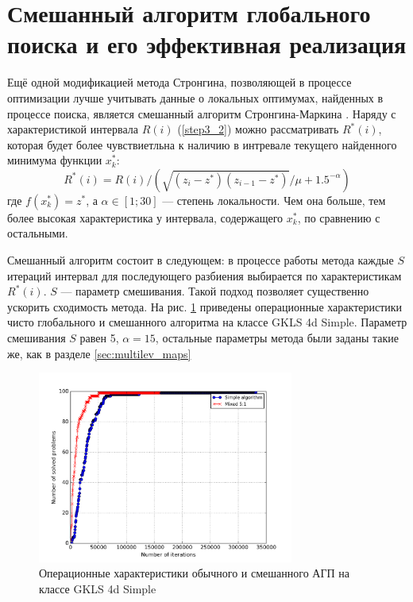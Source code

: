 \section{Смешанный алгоритм глобального поиска и его эффективная реализация}
Ещё одной модификацией метода Стронгина, позволяющей в процессе оптимизации лучше учитывать данные о локальных оптимумах, найденных в процессе поиска, является смешанный алгоритм Стронгина-Маркина \cite{mixedAlg}.
Наряду с характеристикой интервала \(R(i)\) (\ref{step3_2}) можно рассматривать \(R^*(i)\), которая будет более чувствиетльна к наличию в интревале текущего найденного минимума функции \(x_k^*\):
\begin{displaymath}
R^*(i)=R(i)/(\sqrt{(z_i-z^*)(z_{i-1}-z^*)}/\mu + 1.5^{-\alpha})
\end{displaymath}
где \(f(x_k^*)=z^*\), а \(\alpha \in [1;30]\) --- степень локальности. Чем она больше, тем более высокая характеристика у интервала, содержащего \(x_k^*\), по сравнению с остальными.
\par
Смешанный алгоритм состоит в следующем: в процессе работы метода каждые \(S\) итераций интервал для последующего разбиения выбирается по характеристикам \(R^*(i)\). \(S\) --- параметр смешивания.
Такой подход позволяет существенно ускорить сходимость метода. На рис. \ref{fig:localMixOP4d} приведены операционные характеристики чисто глобального и смешанного алгоритма на классе GKLS 4d Simple.
Параметр смешивания \(S\) равен 5, \(\alpha=15\), остальные параметры метода были заданы такие же, как в разделе \ref{sec:multilev_maps}
\begin{figure}[ht]
	\center
  \includegraphics[width=0.75\textwidth]{pictures/mixed_op4d.png}
  \caption{Операционные характеристики обычного и смешанного АГП на классе GKLS 4d Simple}
  \label{fig:localMixOP4d}
\end{figure}
